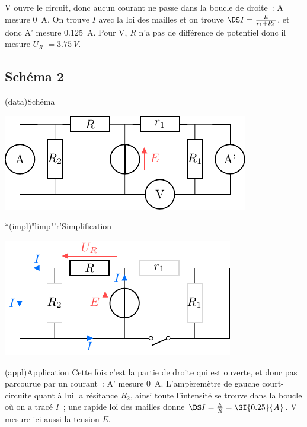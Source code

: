\documentclass[../../main/main.tex]{subfiles}
\begin{document}
{\begin{tcbraster}[raster columns=3, raster equal height=rows]
\begin{tcb}
        V ouvre le circuit, donc aucun courant ne passe dans la boucle de
        droite~: A mesure \SI{0}{A}. On trouve $I$ avec la loi des mailles et on
        trouve $\DS I = \frac{E}{r_1 + R_1}$, et donc A' mesure \SI{0.125}{A}.
        Pour V, $R$ n'a pas de différence de potentiel donc il mesure $U_{R_1}
        = \SI{3.75}{V}$.

    \end{tcb}
\end{tcbraster}
\subsection{Schéma 2}
\begin{tcbraster}[raster columns=2, raster equal height=rows]
    \begin{tcb}(data){Schéma}
        \begin{center}
            \includegraphics{mes_iu_b}
        \end{center}
    \end{tcb}
    \begin{tcb}*(impl)"limp"'r'{Simplification}
        \begin{center}
           \includegraphics{mes_iu_b-simple}
        \end{center} 
    \end{tcb}
\end{tcbraster}
\begin{center}
    \begin{tcb}[width=\linewidth](appl){Application}
        Cette fois c'est la partie de droite qui est ouverte, et donc pas
        parcourue par un courant~: A' mesure \SI{0}{A}. L'ampèremètre de gauche
        court-circuite quant à lui la résitance $R_2$, ainsi toute l'intensité
        se trouve dans la boucle où on a tracé \textcolor{brandeisblue}{$I$}~;
        une rapide loi des mailles donne $\DS I = \frac{E}{R} = \SI{0.25}{A}$. V
        mesure ici aussi la tension $E$.
    \end{tcb}
\end{center}
}
\end{document}
